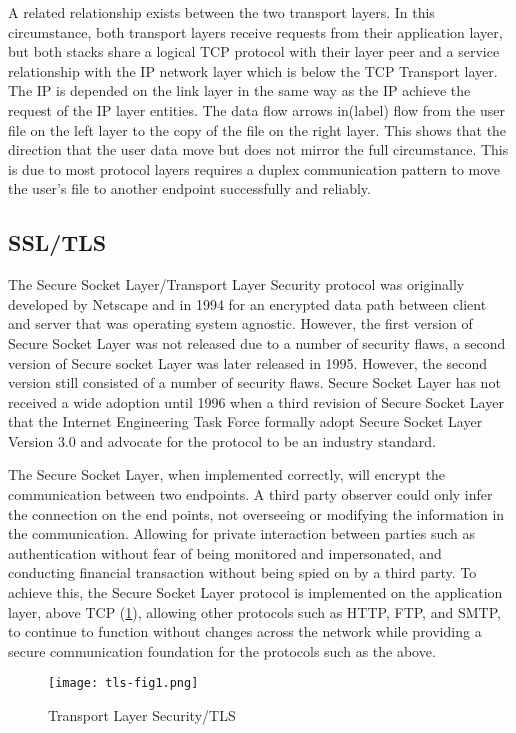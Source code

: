 A related relationship exists between the two transport layers. In this circumstance, both transport layers receive requests from their application layer, but both stacks share a logical TCP protocol with their layer peer and a service relationship with the IP network layer which is below the TCP Transport layer. The IP is depended on the link layer in the same way as the IP achieve the request of the IP layer entities. The data flow arrows in(label) flow from the user file on the left layer to the copy of the file on the right layer. This shows that the direction that the user data move but does not mirror the full circumstance. This is due to most protocol layers requires a duplex communication pattern to move the user's file to another endpoint successfully and reliably.

\subsection{SSL/TLS}
The Secure Socket Layer/Transport Layer Security protocol was originally developed by Netscape and in 1994 for an encrypted data path between client and server that was operating system agnostic. However, the first version of Secure Socket Layer was not released due to a number of security flaws, a second version of Secure socket Layer was later released in 1995. However, the second version still consisted of a number of security flaws. Secure Socket Layer has not received a wide adoption until 1996 when a third revision of Secure Socket Layer that the Internet Engineering Task Force formally adopt Secure Socket Layer Version 3.0 and advocate for the protocol to be an industry standard.

The Secure Socket Layer, when implemented correctly, will encrypt the communication between two endpoints. A third party observer could only infer the connection on the end points, not overseeing or modifying the information in the communication. Allowing for private interaction between parties such as authentication without fear of being monitored and impersonated, and conducting financial transaction without being spied on by a third party. To achieve this, the Secure Socket Layer protocol is implemented on the application layer, above TCP (\ref{fig:tlsfig1}), allowing other protocols such as HTTP, FTP, and SMTP, to continue to function without changes across the network while providing a secure communication foundation for the protocols such as the above.

\begin{figure}[h]
\centering
\texttt{[image: tls-fig1.png]}
\caption{Transport Layer Security/TLS \protect\cite{TLS}}
\label{fig:tlsfig1}
\end{figure}

